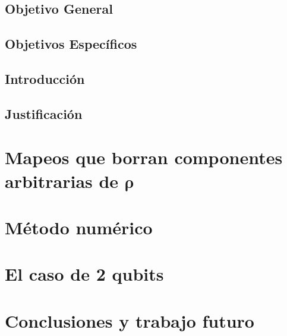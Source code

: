 \documentclass[11pt,dvipsnames]{report} %
\newcommand{\1}{\mathds{1}}
\begin{document}
\newtheorem{property}{Propiedad}[section]
\section*{Objetivo General}
\section*{Objetivos Específicos}
\section*{Introducción}
\section*{Justificación}



\chapter{Mapeos que borran componentes arbitrarias de 
    $\boldsymbol{\rho}$}
\chapter{Método numérico}
\chapter{El caso de 2 qubits}
\chapter{Conclusiones y trabajo futuro}


\end{document}
